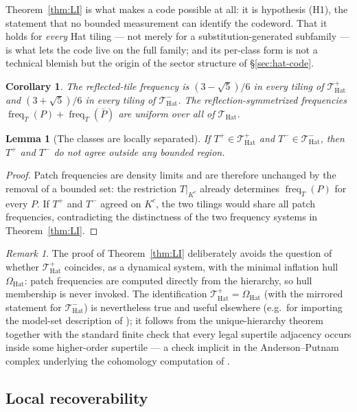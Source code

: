 \documentclass[a4paper,unpublished]{quantumarticle}
\newtheorem{lemma}[theorem]{Lemma}
\newtheorem{corollary}[theorem]{Corollary}
\theoremstyle{remark}
\newtheorem*{remark}{Remark}
\newcommand{\THat}{\mathcal{T}_{\mathrm{Hat}}}
\newcommand{\OHat}{\Omega_{\mathrm{Hat}}}
\newcommand{\freq}{\operatorname{freq}}
\begin{document}
Theorem~\ref{thm:LI} is what makes a code possible at all: it is
hypothesis (H1), the statement that no bounded measurement can
identify the codeword. That it holds for \emph{every} Hat tiling ---
not merely for a substitution-generated subfamily --- is what lets
the code live on the full family; and its per-class form is not a
technical blemish but the origin of the sector structure of
\S\ref{sec:hat-code}.

\begin{corollary}
\label{cor:LI}
The reflected-tile frequency is $(3-\sqrt{5})/6$ in every tiling of
$\THat^{+}$ and $(3+\sqrt{5})/6$ in every tiling of $\THat^{-}$.
The reflection-symmetrized frequencies
$\freq_{T}(P) + \freq_{T}(\bar P)$ are uniform over all of
$\THat$.
\end{corollary}

\begin{lemma}[The classes are locally separated]
\label{lem:separation}
If $T^{+} \in \THat^{+}$ and $T^{-} \in \THat^{-}$, then $T^{+}$
and $T^{-}$ do not agree outside any bounded region.
\end{lemma}

\begin{proof}
Patch frequencies are density limits and are therefore unchanged by
the removal of a bounded set: the restriction $T|_{K^{c}}$ already
determines $\freq_{T}(P)$ for every $P$. If $T^{+}$ and $T^{-}$
agreed on $K^{c}$, the two tilings would share all patch
frequencies, contradicting the distinctness of the two frequency
systems in Theorem~\ref{thm:LI}.
\end{proof}

\begin{remark}
The proof of Theorem~\ref{thm:LI} deliberately avoids the question of
whether $\THat^{+}$ coincides, as a dynamical system, with the
minimal inflation hull $\OHat$: patch frequencies are computed
directly from the hierarchy, so hull membership is never invoked. The
identification $\THat^{+} = \OHat$ (with the mirrored statement for
$\THat^{-}$) is nevertheless true and useful
elsewhere (e.g.\ for importing the model-set description of
\cite{BGS2025}); it follows from the unique-hierarchy theorem
together with the standard finite check that every legal supertile
adjacency occurs inside some higher-order supertile --- a check
implicit in the Anderson--Putnam complex underlying the cohomology
computation of \cite{BGS2025}.
\end{remark}

\subsection{Local recoverability}
\label{sec:hat-rec}
\end{document}

